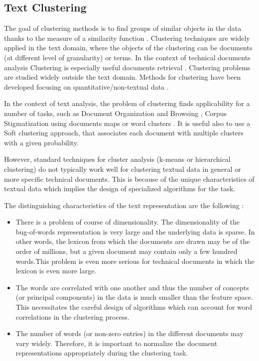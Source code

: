 \documentclass[b5paper,]{book}
\theoremstyle{definition}
\theoremstyle{definition}
\theoremstyle{definition}
\theoremstyle{remark}
\begin{document}
\subsection{Text Clustering}\label{sotatoolsmodelnetanal}

The goal of clustering methods is to find groups of similar objects in
the data thanks to the measure of a similarity function
\citep{jain1988algorithms, kaufman2009finding}. Clustering techniques
are widely applied in the text domain, where the objects of the
clustering can be documents (at different level of granularity) or
terms. In the context of technical documents analysis Clustering is
especially useful documents retrieval
\citep{anick1997exploiting, cutting1993constant}. Clustering problems
are studied widely outside the text domain. Methods for clustering have
been developed focusing on quantitative/non-textual data
\citep{guha1998cure, han2001spatial, zhang1996birch}.

In the context of text analysis, the problem of clustering finds
applicability for a number of tasks, such as Document Organization and
Browsing \citep{cutting2017scatter}, Corpus Stigmatization using
documents maps \citep{schutze1997projections} or word clusters
\citep{baker1998distributional, bekkerman2001feature}. It is useful also
to use a Soft clustering approach, that associates each document with
multiple clusters with a given probability.

However, standard techniques for cluster analysis (k-means or
hierarchical clustering) do not typically work well for clustering
textual data in general or more specific technical documents. This is
because of the unique characteristics of textual data which implies the
design of specialized algorithms for the task.

The distinguishing characteristics of the text representation are the
following \citep{aggarwal2012survey}:

\begin{itemize}
\item
  There is a problem of course of dimensionality. The dimensionality of
  the bug-of-words representation is very large and the underlying data
  is sparse. In other words, the lexicon from which the documents are
  drawn may be of the order of millions, but a given document may
  contain only a few hundred words.This problem is even more serious for
  technical documents in which the lexicon is even more large.
\item
  The words are correlated with one another and thus the number of
  concepts (or principal components) in the data is much smaller than
  the feature space. This necessitates the careful design of algorithms
  which can account for word correlations in the clustering process.
\item
  The number of words (or non-zero entries) in the different documents
  may vary widely. Therefore, it is important to normalize the document
  representations appropriately during the clustering task.
\end{itemize}
\end{document}
